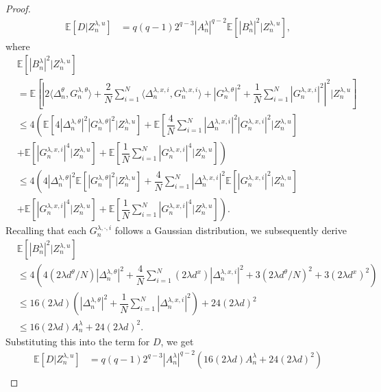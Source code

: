 \documentclass[10pt,a4paper]{amsart}
\begin{document}
\begin{proof}
\begin{align*}
\mathbb{E}[D|Z_n^{\lambda,u}]&=q(q-1)2^{q-3}|A_n^{\lambda}|^{q-2}\mathbb{E}\left[|B_n^{\lambda}|^2|Z_n^{\lambda,u}\right],
\end{align*}
where
\begin{align*}
&\mathbb{E}\left[|B_n^{\lambda}|^2|Z_n^{\lambda,u}\right]\\&=\mathbb{E}\left[{\left|2\langle{ \Delta_n^{\theta},G_n^{\lambda,\theta}}\rangle+\dfrac{2}{N}\sum_{i=1}^N\langle{ \Delta_n^{\lambda,x,i},G_n^{\lambda,x,i}}\rangle+{\left|G_n^{\lambda,\theta}\right|}^2+\dfrac{1}{N}\sum_{i=1}^N{\left|G_n^{\lambda,x,i}\right|}^2\right|}^2|Z_n^{\lambda,u}\right]\\
&\leq 4\left(\mathbb{E}\left[4|\Delta_n^{\lambda,\theta}|^2|G_n^{\lambda,\theta}|^2|Z_n^{\lambda,u}\right]+\mathbb{E}\left[\dfrac{4}{N}\sum_{i=1}^N|\Delta_n^{\lambda,x,i}|^2|G_n^{\lambda,x,i}|^2|Z_n^{\lambda,u}\right]\right.\\
&+\left.\mathbb{E}\left[|G_n^{\lambda,x,i}|^4|Z_n^{\lambda,u}\right]+\mathbb{E}\left[\dfrac{1}{N}\sum_{i=1}^N|G_n^{\lambda,x,i}|^4|Z_n^{\lambda,u}\right]\right)\\
&\leq 4\left(4|\Delta_n^{\lambda,\theta}|^2\mathbb{E}\left[|G_n^{\lambda,\theta}|^2|Z_n^{\lambda,u}\right]+\dfrac{4}{N}\sum_{i=1}^N|\Delta_n^{\lambda,x,i}|^2\mathbb{E}\left[|G_n^{\lambda,x,i}|^2|Z_n^{\lambda,u}\right]\right.\\
&+\left.\mathbb{E}\left[|G_n^{\lambda,x,i}|^4|Z_n^{\lambda,u}\right]+\mathbb{E}\left[\dfrac{1}{N}\sum_{i=1}^N|G_n^{\lambda,x,i}|^4|Z_n^{\lambda,u}\right]\right).
\end{align*}
Recalling that each $G_n^{\lambda,\cdot,i}$ follows a Gaussian distribution, we subsequently derive
\begin{align*}
&\mathbb{E}\left[|B_n^{\lambda}|^2|Z_n^{\lambda,u}\right]\\&\leq 4\left(4(2\lambda d^{\theta}/N)|\Delta_n^{\lambda,\theta}|^2+\dfrac{4}{N}\sum_{i=1}^N(2\lambda d^x)|\Delta_n^{\lambda,x,i}|^2+3(2\lambda d^{\theta}/N)^2+3(2\lambda d^x)^2\right)\\
&\leq 16(2\lambda d)\left(|\Delta_n^{\lambda,\theta}|^2+\dfrac{1}{N}\sum_{i=1}^N|\Delta_n^{\lambda,x,i}|^2\right)+24(2\lambda d)^2\\
&\leq  16(2\lambda d)A_n^{\lambda}+24(2\lambda d)^2.
\end{align*}
Substituting this into the term for $D$, we get
\begin{align}
\mathbb{E}[D|Z_n^{\lambda,u}]&=q(q-1)2^{q-3}|A_n^{\lambda}|^{q-2}\left(16(2\lambda d)A_n^{\lambda}+24(2\lambda d)^2\right)\nonumber\\

\end{align}
\end{proof}
\end{document}
